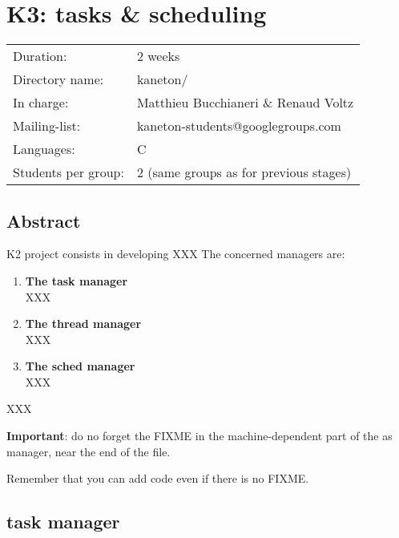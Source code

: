
%
%

\chapter{K3: tasks \& scheduling}

%
%

\begin{tabular}{p{7cm}l}
Duration: & 2 weeks \\
Directory name: & kaneton/ \\
In charge: & Matthieu Bucchianeri \& Renaud Voltz\\
Mailing-list: & kaneton-students@googlegroups.com \\
Languages: & C \\
Students per group: & 2 (same groups as for previous stages) \\
\end{tabular}

\section{Abstract}

K2 project consists in developing XXX
The concerned managers are:

\begin{enumerate}
  \item
    {\bf The task manager}\\
    XXX
  \item
    {\bf The thread manager}\\
    XXX
  \item
    {\bf The sched manager}\\
    XXX
\end{enumerate}

XXX

\textbf{Important}: do no forget the FIXME in the machine-dependent
part of the as manager, near the end of the file.

Remember that you can add code even if there is no FIXME.


%
%

\newpage

\section{\textbf{task} manager}

